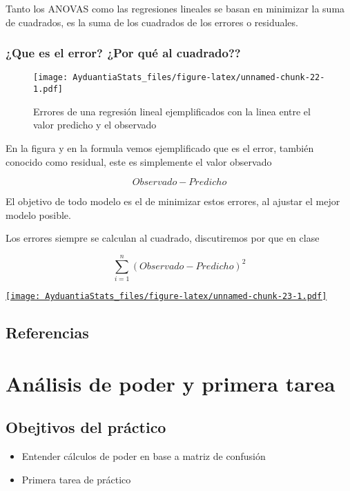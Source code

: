 \documentclass[]{book}
\providecommand{\tightlist}{%
  \setlength{\itemsep}{0pt}\setlength{\parskip}{0pt}}
\begin{document}
Tanto los ANOVAS como las regresiones lineales se basan en minimizar la suma de cuadrados, es la suma de los cuadrados de los errores o residuales.

\hypertarget{que-es-el-error-por-que-al-cuadrado}{%
\subsection{¿Que es el error? ¿Por qué al cuadrado??}\label{que-es-el-error-por-que-al-cuadrado}}

\begin{figure}
\centering
\texttt{[image: AyduantiaStats\_files/figure-latex/unnamed-chunk-22-1.pdf]}
\caption{\label{fig:unnamed-chunk-22}Errores de una regresión lineal ejemplificados con la linea entre el valor predicho y el observado}
\end{figure}

En la figura y en la formula vemos ejemplificado que es el error, también conocido como residual, este es simplemente el valor observado

\[Observado - Predicho\]

El objetivo de todo modelo es el de minimizar estos errores, al ajustar el mejor modelo posible.

Los errores siempre se calculan al cuadrado, discutiremos por que en clase

\[\sum_{i=1}^{n} (Observado - Predicho)^2\]

\href{http://admin.derek-corcoran-barrios.com/shiny/rstudio/sample-apps/Shiny1/}{\texttt{[image: AyduantiaStats\_files/figure-latex/unnamed-chunk-23-1.pdf]}}

\hypertarget{referencias}{%
\section{Referencias}\label{referencias}}

\hypertarget{Poder}{%
\chapter{Análisis de poder y primera tarea}\label{Poder}}

\hypertarget{obejtivos-del-practico}{%
\section{Obejtivos del práctico}\label{obejtivos-del-practico}}

\begin{itemize}
\tightlist
\item
  Entender cálculos de poder en base a matriz de confusión
\item
  Primera tarea de práctico
\end{itemize}
\end{document}
